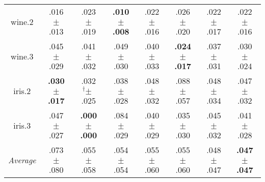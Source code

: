 \begin{tabular}{|c|ccccccc|}
wine.2 & .016$^{\phantom{\dag}}\pm^{\phantom{\dag}}$.013\cellcolor{green!12} & .023$^{\phantom{\dag}}\pm^{\phantom{\dag}}$.019\cellcolor{red!22} & \textbf{.010$^{\phantom{\dag}}\pm^{\phantom{\dag}}$.008}\cellcolor{green!40} & .022$^{\phantom{\dag}}\pm^{\phantom{\dag}}$.016\cellcolor{red!19} & .026$^{\phantom{\dag}}\pm^{\phantom{\dag}}$.020\cellcolor{red!40} & .022$^{\phantom{\dag}}\pm^{\phantom{\dag}}$.017\cellcolor{red!20} & .022$^{\phantom{\dag}}\pm^{\phantom{\dag}}$.016\cellcolor{red!19} \\
wine.3 & .045$^{\phantom{\dag}}\pm^{\phantom{\dag}}$.029\cellcolor{red!26} & .041$^{\phantom{\dag}}\pm^{\phantom{\dag}}$.032\cellcolor{red!13} & .049$^{\phantom{\dag}}\pm^{\phantom{\dag}}$.030\cellcolor{red!40} & .040$^{\phantom{\dag}}\pm^{\phantom{\dag}}$.033\cellcolor{red!9} & \textbf{.024$^{\phantom{\dag}}\pm^{\phantom{\dag}}$.017}\cellcolor{green!40} & .037$^{\phantom{\dag}}\pm^{\phantom{\dag}}$.031\cellcolor{red!2} & .030$^{\phantom{\dag}}\pm^{\phantom{\dag}}$.024\cellcolor{green!21} \\
iris.2 & \textbf{.030$^{\phantom{\dag}}\pm^{\phantom{\dag}}$.017}\cellcolor{green!40} & .032$^{\dag}\pm^{\phantom{\dag}}$.025\cellcolor{green!37} & .038$^{\phantom{\dag}}\pm^{\phantom{\dag}}$.028\cellcolor{green!28} & .048$^{\phantom{\dag}}\pm^{\phantom{\dag}}$.032\cellcolor{green!14} & .088$^{\phantom{\dag}}\pm^{\phantom{\dag}}$.057\cellcolor{red!40} & .048$^{\phantom{\dag}}\pm^{\phantom{\dag}}$.034\cellcolor{green!14} & .047$^{\phantom{\dag}}\pm^{\phantom{\dag}}$.032\cellcolor{green!16} \\
iris.3 & .047$^{\phantom{\dag}}\pm^{\phantom{\dag}}$.027\cellcolor{red!4} & \textbf{.000$^{\phantom{\dag}}\pm^{\phantom{\dag}}$.000}\cellcolor{green!40} & .084$^{\phantom{\dag}}\pm^{\phantom{\dag}}$.029\cellcolor{red!40} & .040$^{\phantom{\dag}}\pm^{\phantom{\dag}}$.029\cellcolor{green!1} & .035$^{\phantom{\dag}}\pm^{\phantom{\dag}}$.030\cellcolor{green!6} & .045$^{\phantom{\dag}}\pm^{\phantom{\dag}}$.032\cellcolor{red!2} & .041$^{\phantom{\dag}}\pm^{\phantom{\dag}}$.028\cellcolor{green!1} \\\hline
\textit{Average} & .073$^{\phantom{\dag}}\pm^{\phantom{\dag}}$.080\cellcolor{red!40} & .055$^{\phantom{\dag}}\pm^{\phantom{\dag}}$.058\cellcolor{green!16} & .054$^{\phantom{\dag}}\pm^{\phantom{\dag}}$.054\cellcolor{green!18} & .055$^{\phantom{\dag}}\pm^{\phantom{\dag}}$.060\cellcolor{green!14} & .055$^{\phantom{\dag}}\pm^{\phantom{\dag}}$.060\cellcolor{green!14} & .048$^{\phantom{\dag}}\pm^{\phantom{\dag}}$.047\cellcolor{green!35} & \textbf{.047$^{\phantom{\dag}}\pm^{\phantom{\dag}}$.047}\cellcolor{green!40} \\\hline
\end{tabular}